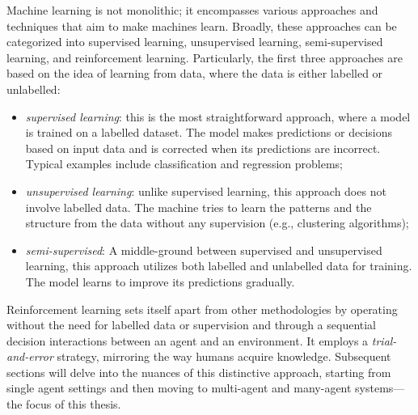 Machine learning is not monolithic; 
 it encompasses various approaches and techniques that aim to make machines learn. 
 Broadly, these approaches can be categorized into supervised learning, unsupervised learning, semi-supervised learning, and reinforcement learning.
%
Particularly, the first three approaches are based on the idea of learning from data, 
 where the data is either labelled or unlabelled:
\begin{itemize}
  \item \emph{supervised learning}: this is the most straightforward approach, where a model is trained on a labelled dataset. 
  The model makes predictions or decisions based on input data and is corrected when its predictions are incorrect. Typical examples include classification and regression problems;
  \item \emph{unsupervised learning}: unlike supervised learning, this approach does not involve labelled data. 
  The machine tries to learn the patterns and the structure from the data without any supervision (e.g., clustering algorithms);
  \item \emph{semi-supervised}: A middle-ground between supervised and unsupervised learning, this approach utilizes both labelled and unlabelled data for training. The model learns to improve its predictions gradually.
\end{itemize}
Reinforcement learning sets itself apart from other methodologies 
 by operating without the need for labelled data or supervision and through a 
 sequential decision interactions between an agent and an environment. 
 It employs a \emph{trial-and-error} strategy, mirroring the way humans acquire knowledge. 
 Subsequent sections will delve into the nuances of this distinctive approach, starting from single agent settings and then moving to multi-agent and many-agent systems---the focus of this thesis.
